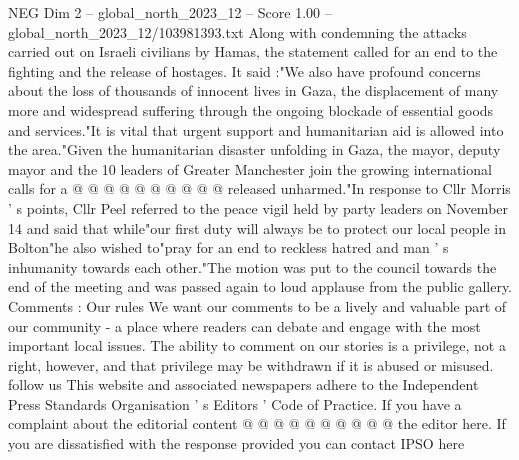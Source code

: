 \begin{textsample}{NEG Dim 2 – global\_north\_2023\_12 – Score 1.00 – global\_north\_2023\_12/103981393.txt}
Along with condemning the attacks carried out on Israeli civilians by Hamas, the statement called for an end to the fighting and the release of hostages.
It said :"We also have profound concerns about the loss of thousands of innocent lives in Gaza, the displacement of many more and widespread suffering through the ongoing blockade of essential goods and services."It is vital that urgent support and humanitarian aid is allowed into the area."Given the humanitarian disaster unfolding in Gaza, the mayor, deputy mayor and the 10 leaders of Greater Manchester join the growing international calls for a @ @ @ @ @ @ @ @ @ @ released unharmed."In response to Cllr Morris ' s points, Cllr Peel referred to the peace vigil held by party leaders on November 14 and said that while"our first duty will always be to protect our local people in Bolton"he also wished to"pray for an end to reckless hatred and man ' s inhumanity towards each other."The motion was put to the council towards the end of the meeting and was passed again to loud applause from the public gallery.
Comments : Our rules We want our comments to be a lively and valuable part of our community - a place where readers can debate and engage with the most important local issues.
The ability to comment on our stories is a privilege, not a right, however, and that privilege may be withdrawn if it is abused or misused. follow us This website and associated newspapers adhere to the Independent Press Standards Organisation ' s Editors ' Code of Practice.
If you have a complaint about the editorial content @ @ @ @ @ @ @ @ @ @ the editor here.
If you are dissatisfied with the response provided you can contact IPSO here

\end{textsample}
